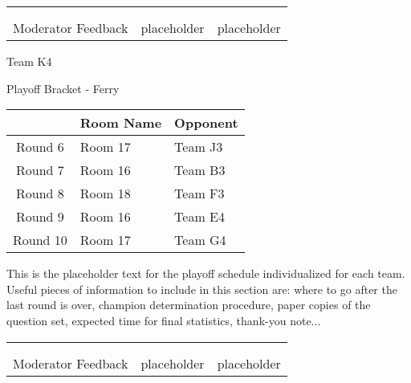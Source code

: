 \documentclass{article}%
\begin{document}
\newline%
%
\begin{tabularx}{\textwidth}{YYY}%
  &  &  \\%
\\%
Moderator Feedback&placeholder&placeholder\\%
\end{tabularx}%
\newpage%
\begin{center}%
\begin{Huge}%
Team K4%
\end{Huge}%
\vspace*{12pt}%
\linebreak%
\begin{Large}%
Playoff Bracket {-} Ferry%
\end{Large}%
\end{center}%
\vspace*{4pt}%
%
\begin{tabularx}{\textwidth}{|c|Y|Y|}%
\hline%
&Room Name&Opponent\\%
\hline%
Round 6&Room 17&Team J3\\%
Round 7&Room 16&Team B3\\%
Round 8&Room 18&Team F3\\%
Round 9&Room 16&Team E4\\%
Round 10&Room 17&Team G4\\%
\hline%
\end{tabularx}%
\vspace*{30pt}%
\linebreak%
This is the placeholder text for the playoff schedule individualized for each team. Useful pieces of information to include in this section are: where to go after the last round is over, champion determination procedure, paper copies of the question set, expected time for final statistics, thank{-}you note...%
\vspace*{30pt}%
\newline%
%
\begin{tabularx}{\textwidth}{YYY}%
  &  &  \\%
\\%
Moderator Feedback&placeholder&placeholder\\%
\end{tabularx}%
\end{document}
